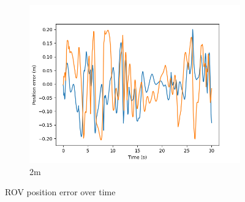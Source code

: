 \documentclass[class=article, crop=false]{standalone}
\begin{document}
\begin{figure}
\begin{subfigure}[b]{0.48\textwidth}
        \centering
        \includegraphics{scenario1/rov-0m/2.0m/rov_position_error_controlled}
        \caption{2m}
        \label{}
    \end{subfigure}

    \caption{ROV position error over time}
\end{figure}
\end{document}
